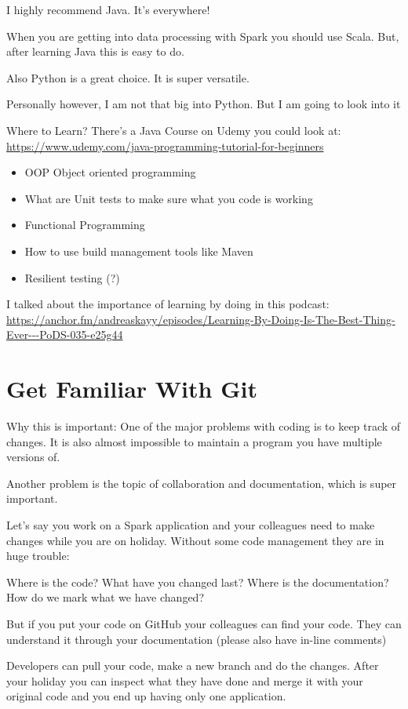 \documentclass[12pt, numbers=noenddot]{scrreprt} %
\begin{document}
I highly recommend Java. It’s everywhere!

When you are getting into data processing with Spark you should use Scala. But, after learning Java this is easy to do.

Also Python is a great choice. It is super versatile.

Personally however, I am not that big into Python. But I am going to look into it

Where to Learn?
There’s a Java Course on Udemy you could look at: \url{https://www.udemy.com/java-programming-tutorial-for-beginners}

\begin{itemize}
\item OOP Object oriented programming
\item What are Unit tests to make sure what you code is working
\item Functional Programming
\item How to use build management tools like Maven
\item Resilient testing (?)
\end{itemize}
I talked about the importance of learning by doing in this podcast:
\url{https://anchor.fm/andreaskayy/episodes/Learning-By-Doing-Is-The-Best-Thing-Ever---PoDS-035-e25g44}

\chapter{Get Familiar With Git}
Why this is important: One of the major problems with coding is to keep track of changes. It is also almost impossible to maintain a program you have multiple versions of.

Another problem is the topic of collaboration and documentation, which is super important.

Let’s say you work on a Spark application and your colleagues need to make changes while you are on holiday. Without some code management they are in huge trouble:

Where is the code? What have you changed last? Where is the documentation? How do we mark what we have changed?

But if you put your code on GitHub your colleagues can find your code. They can understand it through your documentation (please also have in-line comments)

Developers can pull your code, make a new branch and do the changes. After your holiday you can inspect what they have done and merge it with your original code and you end up having only one application.
\end{document}
